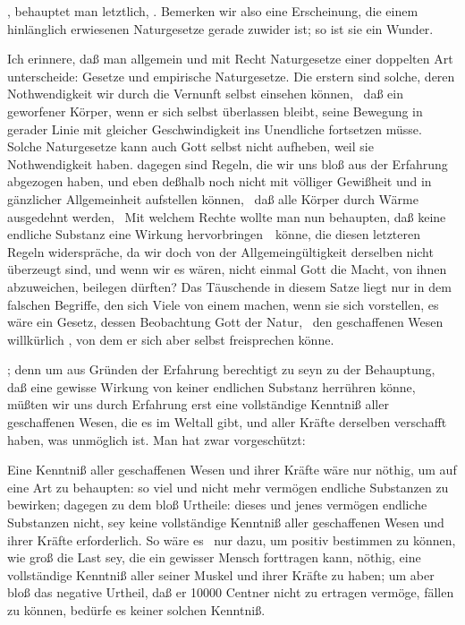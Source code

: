 \begin{aufzb}\setcounter{enumi}{2}
\item {}, behauptet man letztlich, . Bemerken wir also eine Erscheinung, die einem hinlänglich erwiesenen Naturgesetze gerade zuwider ist; so ist sie ein Wunder.
\end{aufzb}\par
Ich erinnere, daß man allgemein und mit Recht Naturgesetze einer doppelten Art unterscheide: Gesetze  und empirische Naturgesetze. Die erstern sind solche, deren Nothwendigkeit wir durch die Vernunft selbst einsehen können, \zB\ daß ein geworfener Körper, wenn er sich selbst überlassen bleibt, seine Bewegung in gerader Linie mit gleicher Geschwindigkeit ins Unendliche fortsetzen müsse. Solche Naturgesetze kann auch Gott selbst nicht aufheben, weil sie Nothwendigkeit haben.  dagegen sind Regeln, die wir uns bloß aus der Erfahrung abgezogen haben, und eben deßhalb noch nicht mit völliger Gewißheit und in gänzlicher Allgemeinheit aufstellen können, \zB\ daß alle Körper durch Wärme ausgedehnt werden, \udgl\  Mit welchem Rechte wollte man nun behaupten, daß keine endliche Substanz eine Wirkung hervorbringen~\ könne, die diesen letzteren Regeln widerspräche, da wir doch von der Allgemeingültigkeit derselben nicht überzeugt sind, und wenn wir es wären, nicht einmal Gott die Macht, von ihnen abzuweichen, beilegen dürften? Das Täuschende in diesem Satze liegt nur in dem falschen Begriffe, den sich Viele von einem  machen, wenn sie sich vorstellen, es wäre ein Gesetz, dessen Beobachtung Gott der Natur, \dh\ den geschaffenen Wesen willkürlich , von dem er sich aber selbst freisprechen könne.
\begin{aufza}\setcounter{enumi}{3}
\item {}; denn um aus Gründen der Erfahrung berechtigt zu seyn zu der Behauptung, daß eine gewisse Wirkung von keiner endlichen Substanz herrühren könne, müßten wir uns durch Erfahrung erst eine vollständige Kenntniß aller geschaffenen Wesen, die es im Weltall gibt, und aller Kräfte derselben verschafft haben, was unmöglich ist. Man hat zwar vorgeschützt:
\begin{aufzb}
\item Eine  Kenntniß aller geschaffenen Wesen und ihrer Kräfte wäre nur nöthig, um auf eine  Art zu behaupten: so viel und nicht mehr vermögen endliche Substanzen zu bewirken; dagegen zu dem bloß  Urtheile: dieses und jenes vermögen endliche Substanzen nicht, sey keine vollständige Kenntniß aller geschaffenen Wesen und ihrer Kräfte erforderlich. So wäre es \zB\ nur dazu, um positiv bestimmen zu können, wie groß die Last sey, die ein gewisser Mensch forttragen kann, nöthig, eine vollständige Kenntniß aller seiner Muskel und ihrer Kräfte zu haben; um aber bloß das negative Urtheil, daß er 10000 Centner nicht zu ertragen vermöge, fällen zu können, bedürfe es keiner solchen Kenntniß.
\end{aufzb}
\end{aufza}\par
